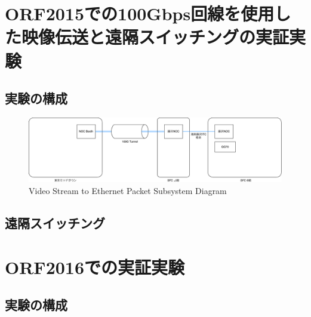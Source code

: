 \chapter{ORF2015での100Gbps回線を使用した映像伝送と遠隔スイッチングの実証実験}
\label{chap:orf2015}

\section{実験の構成}
\begin{figure}[htbp]
    \begin{center}
        \includegraphics[bb=0 0 1101 282,width=15.5cm]{img/orf2015-flow.pdf}
    \end{center}
    \caption{Video Stream to Ethernet Packet Subsystem Diagram}
    \label{fig:orf2015-flow}
\end{figure}

\section{遠隔スイッチング}

\chapter{ORF2016での実証実験}
\label{chap:orf2016}
\section{実験の構成}
